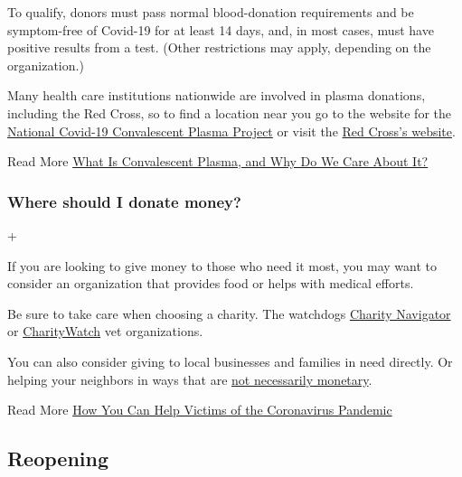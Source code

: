 To qualify, donors must pass normal blood-donation requirements and be
symptom-free of Covid-19 for at least 14 days, and, in most cases, must
have positive results from a test. (Other restrictions may apply,
depending on the organization.)

Many health care institutions nationwide are involved in plasma
donations, including the Red Cross, so to find a location near you go to
the website for the \href{https://ccpp19.org/}{National Covid-19
Convalescent Plasma Project} or visit the
\href{https://www.redcrossblood.org/donate-blood/dlp/plasma-donations-from-recovered-covid-19-patients.html}{Red
Cross's website}.

 Read More
\href{https://www.nytimes3xbfgragh.onion/2020/04/24/smarter-living/coronavirus-convalescent-plasma-antibodies.html}{What
Is Convalescent Plasma, and Why Do We Care About It?}

\hypertarget{where-should-i-donate-money}{%
\subsubsection{Where should I donate
money?}\label{where-should-i-donate-money}}

+

If you are looking to give money to those who need it most, you may want
to consider an organization that provides food or helps with medical
efforts.

Be sure to take care when choosing a charity. The watchdogs
\href{https://www.charitynavigator.org/index.cfm?bay=content.view\&cpid=7779\&mod=article_inline}{Charity
Navigator} or
\href{https://www.charitywatch.org/charity-donating-articles/coronavirus-outbreak?mod=article_inline}{CharityWatch}
vet organizations.

You can also consider giving to local businesses and families in need
directly. Or helping your neighbors in ways that are
\href{https://www.nytimes3xbfgragh.onion/2020/03/15/smarter-living/wirecutter/5-ways-to-help-during-coronavirus-while-social-distancing.html}{not
necessarily monetary}.

 Read More
\href{https://www.nytimes3xbfgragh.onion/article/coronavirus-how-to-help-donations-charities.html}{How
You Can Help Victims of the Coronavirus Pandemic}

\hypertarget{reopening}{%
\subsection{Reopening}\label{reopening}}

